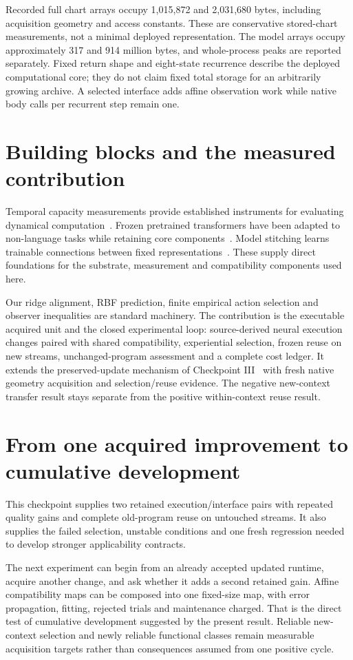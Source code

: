 \documentclass[11pt]{article}
\begin{document}
Recorded full chart arrays occupy 1,015,872 and 2,031,680 bytes, including acquisition geometry and access constants. These are conservative stored-chart measurements, not a minimal deployed representation. The model arrays occupy approximately 317 and 914 million bytes, and whole-process peaks are reported separately. Fixed return shape and eight-state recurrence describe the deployed computational core; they do not claim fixed total storage for an arbitrarily growing archive. A selected interface adds affine observation work while native body calls per recurrent step remain one.

\section{Building blocks and the measured contribution}
Temporal capacity measurements provide established instruments for evaluating dynamical computation~\cite{dambre}. Frozen pretrained transformers have been adapted to non-language tasks while retaining core components~\cite{lu}. Model stitching learns trainable connections between fixed representations~\cite{stitch}. These supply direct foundations for the substrate, measurement and compatibility components used here.

Our ridge alignment, RBF prediction, finite empirical action selection and observer inequalities are standard machinery. The contribution is the executable acquired unit and the closed experimental loop: source-derived neural execution changes paired with shared compatibility, experiential selection, frozen reuse on new streams, unchanged-program assessment and a complete cost ledger. It extends the preserved-update mechanism of Checkpoint III~\cite{sg3} with fresh native geometry acquisition and selection/reuse evidence. The negative new-context transfer result stays separate from the positive within-context reuse result.

\section{From one acquired improvement to cumulative development}
This checkpoint supplies two retained execution/interface pairs with repeated quality gains and complete old-program reuse on untouched streams. It also supplies the failed selection, unstable conditions and one fresh regression needed to develop stronger applicability contracts.

The next experiment can begin from an already accepted updated runtime, acquire another change, and ask whether it adds a second retained gain. Affine compatibility maps can be composed into one fixed-size map, with error propagation, fitting, rejected trials and maintenance charged. That is the direct test of cumulative development suggested by the present result. Reliable new-context selection and newly reliable functional classes remain measurable acquisition targets rather than consequences assumed from one positive cycle.
\end{document}
